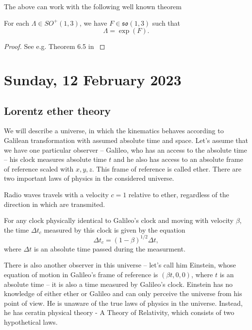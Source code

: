 \documentclass[main.tex]{subfiles}
\begin{document}
The above can work with the following well known theorem
\begin{theorem}
For each $\Lambda\in SO^{+}(1, 3)$, we have $F\in \mathfrak{so}(1,3)$ such that
\begin{equation}
\Lambda = \exp(F).
\end{equation}
\end{theorem}
\begin{proof}
See e.g. Theorem 6.5 in \cite{hall2004}
\end{proof}

\section{Sunday, 12 February 2023}

\subsection{Lorentz ether theory}

We will describe a universe, in which the kinematics behaves according to Galilean transformation with assumed absolute time and space. Let's assume that we have one particular observer -- Galileo, who has an access to the absolute time -- his clock measures absolute time $t$ and he also has access to an absolute frame of reference scaled with $x, y, z$. This frame of reference is called ether. There are two important laws of physics in the considered universe.

\begin{law}
Radio waves travels with a velocity $c = 1$ relative to ether, regardless of the direction in which are transmited.
\end{law}

\begin{law}
\label{law-of-time-dilatation}
For any clock physically identical to Galileo's clock and moving with velocity $\beta$,  the time $\Delta t_c$ measured by this clock is given by the equation
\begin{equation}
\Delta t_c = (1 - \beta)^{1/2}\Delta t,
\end{equation} 
where $\Delta t$ is an absolute time passed during the measurment.
\end{law} 

There is also another observer in this universe -- let's call him Einstein, whose equation of motion in Galileo's frame of reference is $(\beta t, 0, 0)$, where $t$ is an absolute time -- it is also a time measured by Galileo's clock. Einstein has no knowledge of either ether or Galileo and can only perceive the universe from his point of view. He is unaware of the true laws of physics in the universe. Instead, he has ceratin physical theory - A Theory of Relativity, which consists of two hypothetical laws.
\end{document}
